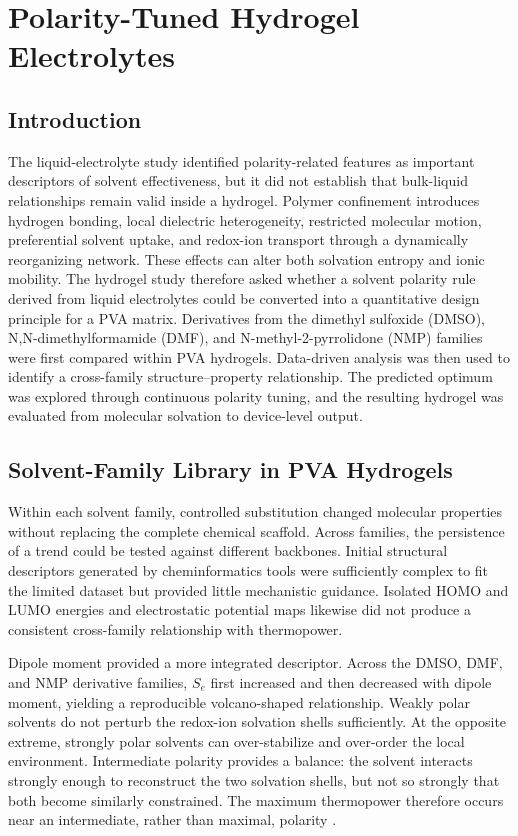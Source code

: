 \chapter{Polarity-Tuned Hydrogel Electrolytes}

\section{Introduction}

The liquid-electrolyte study identified polarity-related features as important
descriptors of solvent effectiveness, but it did not establish that bulk-liquid
relationships remain valid inside a hydrogel. Polymer confinement introduces
hydrogen bonding, local dielectric heterogeneity, restricted molecular motion,
preferential solvent uptake, and redox-ion transport through a dynamically
reorganizing network. These effects can alter both solvation entropy and ionic
mobility. The hydrogel study therefore asked whether a solvent polarity rule
derived from liquid electrolytes could be converted into a quantitative design
principle for a PVA matrix. Derivatives from the
dimethyl sulfoxide (DMSO), N,N-dimethylformamide (DMF), and
N-methyl-2-pyrrolidone (NMP) families were first compared within PVA
hydrogels. Data-driven analysis was then used to identify a cross-family
structure--property relationship. The predicted optimum was explored through
continuous polarity tuning, and the resulting hydrogel was evaluated from
molecular solvation to device-level output.

\section{Solvent-Family Library in PVA Hydrogels}

Within each solvent family, controlled substitution changed molecular
properties without replacing the complete chemical scaffold. Across families,
the persistence of a trend could be tested against different backbones.
Initial structural descriptors generated by cheminformatics tools were
sufficiently complex to fit the limited dataset but provided little
mechanistic guidance. Isolated HOMO and LUMO energies and electrostatic
potential maps likewise did not produce a consistent cross-family relationship
with thermopower.

Dipole moment provided a more integrated descriptor. Across the DMSO, DMF, and
NMP derivative families, $S_e$ first increased and then decreased with dipole
moment, yielding a reproducible volcano-shaped relationship. Weakly polar
solvents do not perturb the redox-ion solvation shells sufficiently. At the
opposite extreme, strongly polar solvents can over-stabilize and over-order the
local environment. Intermediate polarity provides a balance: the solvent
interacts strongly enough to reconstruct the two solvation shells, but not so
strongly that both become similarly constrained. The maximum thermopower
therefore occurs near an intermediate, rather than maximal, polarity
.

